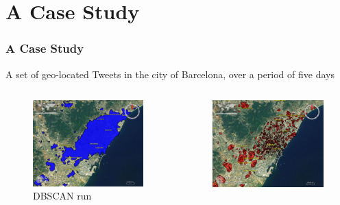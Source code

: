 \documentclass[hyperref={pdfpagelabels=true}]{beamer}
\begin{document}
\section{A Case Study} 
\begin{frame}
\frametitle{A Case Study}
 A set of geo-located Tweets in the city of Barcelona, over a period of five days
\begin{columns}
  \begin{column}{0.5\textwidth}
    \begin{figure}  
	\includegraphics[width=\textwidth]{sim1b.png}\\
           \tiny{DBSCAN run}%
       \end{figure}             
  \end{column}
  \begin{column}{0.5\textwidth}
      \begin{figure}  
	\includegraphics[width=\textwidth]{sim6.png}\\

\end{figure}
\end{column}
\end{columns}
\end{frame}
\end{document}

